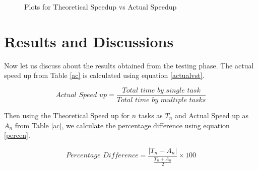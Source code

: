 \documentclass[conference]{IEEEtran}
\begin{document}
	\begin{figure}[!t]
	\centering
	\caption{Plots for Theoretical Speedup vs Actual Speedup}
\end{figure}

	\section{Results and Discussions}
	
	
	Now let us discuss about the results obtained from the testing phase. The actual speed up from Table \ref{ac} is calculated using equation \ref{actualvst}. 
	
	\begin{equation}
		\label{actualvst}
		\textit{Actual Speed up} = \frac{\textit{Total time by single task}}{\textit{Total time by multiple tasks}}
	\end{equation}
	
	Then using the Theoretical Speed up for $n$ tasks as $T_n$  and Actual Speed up as $A_n$ from Table \ref{ac}, we calculate the percentage difference using equation \ref{percen}. 
	
	\begin{equation}
	\label{percen}
	\textit{Percentage Difference} = \frac{|T_n - A_n|}{\frac{T_n + A_n}{2}} \times 100	\end{equation}
	
\end{document}
